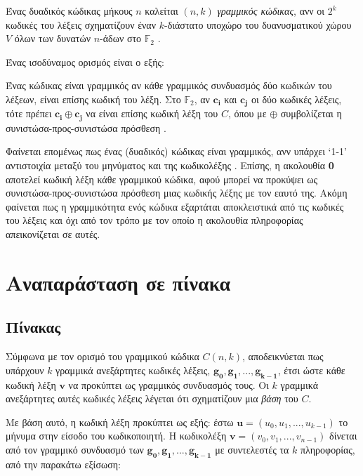 \begin{definition}
Ένας δυαδικός κώδικας μήκους $n$ καλείται $(n,k)$ \textit{γραμμικός  κώδικας}, ανν οι $2^k$ κωδικές του λέξεις σχηματίζουν έναν $k$-διάστατο υποχώρο του δυανυσματικού χώρου $V$ όλων των δυνατών $n$-άδων στο $\mathbb{F}_2$ \cite{ryan2009channel}.
\label{def:linear block code}
\end{definition}

Ένας ισοδύναμος ορισμός είναι ο εξής:

\begin{definition}
Ένας κώδικας  είναι γραμμικός αν κάθε γραμμικός συνδυασμός δύο κωδικών του λέξεων, είναι επίσης κωδική του λέξη. Στο $\mathbb{F}_2$, αν $\mathbf{c_i}$ και $\mathbf{c_j}$ οι δύο κωδικές λέξεις, τότε πρέπει $\mathbf{c_i}\oplus\mathbf{c_j}$ να είναι επίσης κωδική λέξη του $C$, όπου με $\oplus$ συμβολίζεται η συνιστώσα-προς-συνιστώσα  πρόσθεση \cite{proakis1994communication}.
\end{definition}

Φαίνεται επομένως πως ένας (δυαδικός)  κώδικας είναι γραμμικός, ανν υπάρχει \enquote*{1-1} αντιστοιχία μεταξύ του μηνύματος  και της κωδικολέξης . Επίσης, η ακολουθία \textbf{0} αποτελεί κωδική λέξη κάθε γραμμικού  κώδικα, αφού μπορεί να προκύψει ως συνιστώσα-προς-συνιστώσα  πρόσθεση μιας κωδικής λέξης με τον εαυτό της. Ακόμη φαίνεται πως η γραμμικότητα ενός κώδικα εξαρτάται αποκλειστικά από τις κωδικές του λέξεις και όχι από τον τρόπο με τον οποίο η ακολουθία πληροφορίας απεικονίζεται σε αυτές.

\section{Αναπαράσταση σε πίνακα}

\subsection{Πίνακας }
Σύμφωνα με τον ορισμό του γραμμικού  κώδικα $C(n,k)$, αποδεικνύεται πως υπάρχουν $k$ γραμμικά ανεξάρτητες κωδικές λέξεις, $\mathbf{g_0, g_1, ..., g_{k-1}}$, έτσι ώστε κάθε κωδική λέξη $\mathbf{v}$ να προκύπτει ως γραμμικός συνδυασμός τους. Οι $k$ γραμμικά ανεξάρτητες αυτές κωδικές λέξεις λέγεται ότι σχηματίζουν μια \textit{βάση} του $C$.

Με βάση αυτό, η κωδική λέξη προκύπτει ως εξής: έστω $\mathbf{u} = (u_0, u_1, ..., u_{k-1})$ το μήνυμα στην είσοδο του κωδικοποιητή. Η κωδικολέξη $\mathbf{v} = (v_0, v_1, ..., v_{n-1})$ δίνεται από τον γραμμικό συνδυασμό των $\mathbf{g_0, g_1, ..., g_{k-1}}$ με συντελεστές τα $k$  πληροφορίας, από την παρακάτω εξίσωση:

